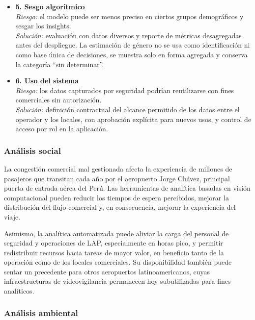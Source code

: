 \documentclass[12pt,letterpaper]{article}
\begin{document}
\begin{itemize}
    \item \textbf{5. Sesgo algorítmico} \\
    \textit{Riesgo:} el modelo puede ser menos preciso en ciertos grupos
    demográficos y sesgar los insights. \\
    \textit{Solución:} evaluación con datos diversos y reporte de
    métricas desagregadas antes del despliegue. La estimación de género
    no se usa como identificación ni como base única de decisiones, se
    muestra solo en forma agregada y conserva la categoría ``sin
    determinar''.

    \item \textbf{6. Uso del sistema} \\
    \textit{Riesgo:} los datos capturados por seguridad podrían
    reutilizarse con fines comerciales sin autorización. \\
    \textit{Solución:} definición contractual del alcance permitido de
    los datos entre el operador y los locales, con aprobación explícita
    para nuevos usos, y control de acceso por rol en la aplicación.
\end{itemize}

\subsubsection{Análisis social}

La congestión comercial mal gestionada afecta la experiencia de millones
de pasajeros que transitan cada año por el aeropuerto Jorge Chávez,
principal puerta de entrada aérea del Perú. Las herramientas de
analítica basadas en visión computacional pueden reducir los tiempos de
espera percibidos, mejorar la distribución del flujo comercial y, en
consecuencia, mejorar la experiencia del viaje.

Asimismo, la analítica automatizada puede aliviar la carga del personal
de seguridad y operaciones de LAP, especialmente en horas pico, y
permitir redistribuir recursos hacia tareas de mayor valor, en beneficio
tanto de la operación como de los locales comerciales. Su disponibilidad
también puede sentar un precedente para otros aeropuertos
latinoamericanos, cuyas infraestructuras de videovigilancia permanecen
hoy subutilizadas para fines analíticos.

\subsubsection{Análisis ambiental}
\end{document}
